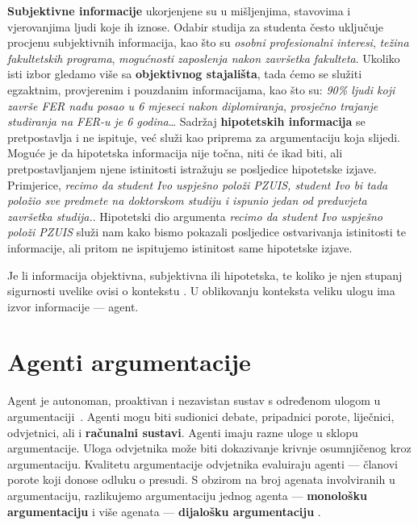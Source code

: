 \textbf{Subjektivne informacije} ukorjenjene su u mišljenjima, stavovima i vjerovanjima ljudi
koje ih iznose. Odabir studija za studenta često uključuje procjenu 
subjektivnih informacija, kao što su \emph{osobni profesionalni interesi}, 
\emph{težina fakultetskih programa}, \emph{mogućnosti zaposlenja nakon završetka fakulteta}. 
Ukoliko isti izbor gledamo više sa \textbf{objektivnog stajališta}, tada 
ćemo se služiti egzaktnim, provjerenim i pouzdanim informacijama, kao što su:
\emph{90\% ljudi koji završe FER nađu posao u 6 mjeseci nakon diplomiranja}, 
\emph{prosječno trajanje studiranja na FER-u je 6 godina}\dots \@
Sadržaj \textbf{hipotetskih informacija} se pretpostavlja i ne ispituje, već služi 
kao priprema za argumentaciju koja slijedi. Moguće je da 
hipotetska informacija nije točna, niti će ikad biti, ali pretpostavljanjem njene istinitosti
istražuju se posljedice hipotetske izjave. 
Primjerice, \emph{recimo da student Ivo uspješno položi PZUIS, student Ivo
bi tada položio sve predmete na doktorskom studiju i ispunio jedan od preduvjeta završetka studija.}. 
Hipotetski dio argumenta \emph{recimo da student Ivo uspješno položi PZUIS}
služi nam kako bismo pokazali posljedice ostvarivanja istinitosti te informacije,
ali pritom ne ispitujemo istinitost same hipotetske izjave. 

Je li informacija objektivna, subjektivna ili hipotetska, te koliko je njen 
stupanj sigurnosti uvelike ovisi o kontekstu \citep{oren2007subjective}.
U oblikovanju konteksta veliku ulogu ima izvor informacije --- agent.  

\section{Agenti argumentacije}

Agent  je autonoman, proaktivan i nezavistan sustav s određenom
ulogom u argumentaciji~\citep{besnard2008elements}. 
Agenti mogu biti sudionici debate, pripadnici porote, liječnici, odvjetnici, ali
i \textbf{računalni sustavi}. Agenti imaju razne uloge u sklopu argumentacije.  Uloga
odvjetnika može biti dokazivanje krivnje osumnjičenog kroz argumentaciju.
Kvalitetu argumentacije odvjetnika evaluiraju agenti --- članovi porote koji
donose odluku o presudi. S obzirom na broj agenata involviranih u argumentaciju, 
razlikujemo argumentaciju jednog agenta --- \textbf{monološku argumentaciju}
 i više agenata --- \textbf{dijalošku argumentaciju}
. 

